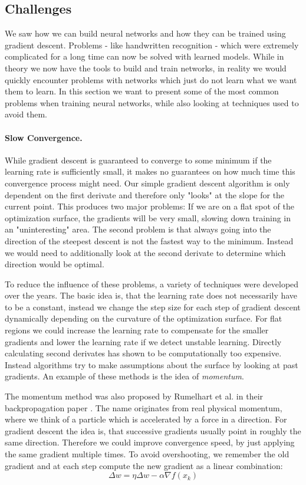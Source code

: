\subsection{Challenges} \label{sec:NNChallenges}
We saw how we can build neural networks and how they can be trained using gradient descent. Problems - like handwritten recognition - which were extremely complicated for a long time can now be solved with learned models. While in theory we now have the tools to build and train networks, in reality we would quickly encounter problems with networks which just do not learn what we want them to learn. In this section we want to present some of the most common problems when training neural networks, while also looking at techniques used to avoid them.

\paragraph{Slow Convergence.}
While gradient descent is guaranteed to converge to some minimum if the learning rate is sufficiently small, it makes no guarantees on how much time this convergence process might need. Our simple gradient descent algorithm is only dependent on the first derivate and therefore only "looks" at the slope for the current point. This produces two major problems: If we are on a flat spot of the optimization surface, the gradients will be very small, slowing down training in an "uninteresting" area. The second problem is that always going into the direction of the steepest descent is not the fastest way to the minimum. Instead we would need to additionally look at the second derivate to determine which direction would be optimal. 

To reduce the influence of these problems, a variety of techniques were developed over the years. The basic idea is, that the learning rate does not necessarily have to be a constant, instead we change the step size for each step of gradient descent dynamically depending on the curvature of the optimization surface. For flat regions we could increase the learning rate to compensate for the smaller gradients and lower the learning rate if we detect unstable learning. Directly calculating second derivates has shown to be computationally too expensive. Instead algorithms try to make assumptions about the surface by looking at past gradients. An example of these methods is the idea of \textit{momentum}. 

The momentum method was also proposed by Rumelhart et al. in their backpropagation paper \cite{rumelhart1986learning}. The name originates from real physical momentum, where we think of a particle which is accelerated by a force in a direction. For gradient descent the idea is, that successive gradients usually point in roughly the same direction. Therefore we could improve convergence speed, by just applying the same gradient multiple times. To avoid overshooting, we remember the old gradient and at each step compute the new gradient as a linear combination: 
    \[\Delta w = \eta \Delta w - \alpha \nabla f(x_k)\]

